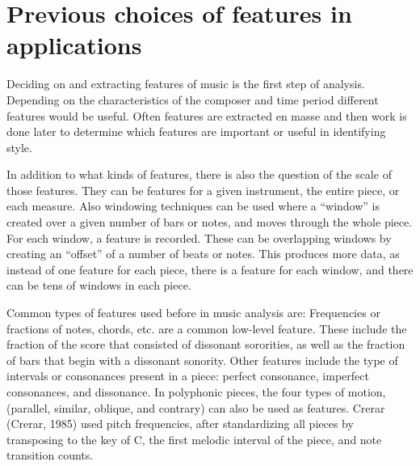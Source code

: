 \documentclass[12pt,twoside]{reedthesis}
\theoremstyle{definition}
\theoremstyle{definition}
\theoremstyle{definition}
\theoremstyle{remark}
\begin{document}
\section{Previous choices of features in
applications}\label{previous-choices-of-features-in-applications}

Deciding on and extracting features of music is the first step of
analysis. Depending on the characteristics of the composer and time
period different features would be useful. Often features are extracted
en masse and then work is done later to determine which features are
important or useful in identifying style.

In addition to what kinds of features, there is also the question of the
scale of those features. They can be features for a given instrument,
the entire piece, or each measure. Also windowing techniques can be used
where a ``window'' is created over a given number of bars or notes, and
moves through the whole piece. For each window, a feature is recorded.
These can be overlapping windows by creating an ``offset'' of a number
of beats or notes. This produces more data, as instead of one feature
for each piece, there is a feature for each window, and there can be
tens of windows in each piece.

Common types of features used before in music analysis are: Frequencies
or fractions of notes, chords, etc. are a common low-level feature.
These include the fraction of the score that consisted of dissonant
sororities, as well as the fraction of bars that begin with a dissonant
sonority. Other features include the type of intervals or consonances
present in a piece: perfect consonance, imperfect consonances, and
dissonance. In polyphonic pieces, the four types of motion, (parallel,
similar, oblique, and contrary) can also be used as features. Crerar
(Crerar, 1985) used pitch frequencies, after standardizing all pieces by
transposing to the key of C, the first melodic interval of the piece,
and note transition counts.
\end{document}

